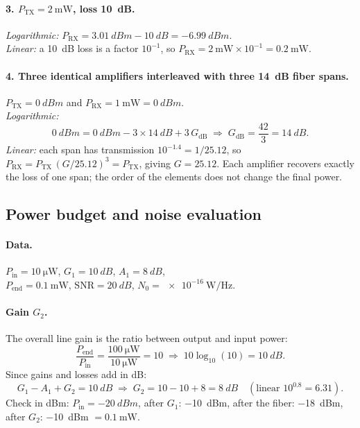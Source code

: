 \paragraph{3. $P_\mathrm{TX} = \SI{2}{\milli\watt}$, loss \SI{10}{dB}.}
\emph{Logarithmic:} $P_\mathrm{RX} = \SI{3.01}{dBm} - \SI{10}{dB} = \SI{-6.99}{dBm}$.\\
\emph{Linear:} a \SI{10}{dB} loss is a factor $10^{-1}$, so
$P_\mathrm{RX} = \SI{2}{\milli\watt}\times 10^{-1} = \SI{0.2}{\milli\watt}$.

\paragraph{4. Three identical amplifiers interleaved with three \SI{14}{dB} fiber spans.}
$P_\mathrm{TX} = \SI{0}{dBm}$ and $P_\mathrm{RX} = \SI{1}{\milli\watt} = \SI{0}{dBm}$.\\
\emph{Logarithmic:}
\begin{equation}
  \SI{0}{dBm} = \SI{0}{dBm} - 3\times\SI{14}{dB} + 3\,G_\mathrm{dB}
  \;\Rightarrow\; G_\mathrm{dB} = \frac{42}{3} = \SI{14}{dB}.
\end{equation}
\emph{Linear:} each span has transmission $10^{-1.4} = 1/25.12$, so
$P_\mathrm{RX} = P_\mathrm{TX}\,(G/25.12)^3 = P_\mathrm{TX}$, giving $G = 25.12$.
Each amplifier recovers exactly the loss of one span; the order of the elements does not change the
final power.


\subsection{Power budget and noise evaluation}
\label{sec:2_4}
\paragraph{Data.} $P_\mathrm{in} = \SI{10}{\micro\watt}$, $G_1 = \SI{10}{dB}$, $A_1 = \SI{8}{dB}$,\\
$P_\mathrm{end} = \SI{0.1}{\milli\watt}$, $\mathrm{SNR} = \SI{20}{dB}$, $N_0 = \SI{e-16}{\watt\per\hertz}$.

\paragraph{Gain $G_2$.}
The overall line gain is the ratio between output and input power:
\begin{equation}
  \frac{P_\mathrm{end}}{P_\mathrm{in}} = \frac{\SI{100}{\micro\watt}}{\SI{10}{\micro\watt}} = 10
  \;\Rightarrow\; 10\log_{10}(10) = \SI{10}{dB}.
\end{equation}
Since gains and losses add in dB:
\begin{equation}
  G_1 - A_1 + G_2 = \SI{10}{dB}
  \;\Rightarrow\; G_2 = 10 - 10 + 8 = \SI{8}{dB} \quad (\text{linear } 10^{0.8} = 6.31).
\end{equation}
Check in dBm: $P_\mathrm{in} = \SI{-20}{dBm}$, after $G_1$: \SI{-10}{dBm}, after the fiber: \SI{-18}{dBm},
after $G_2$: \SI{-10}{dBm} $= \SI{0.1}{\milli\watt}$.

